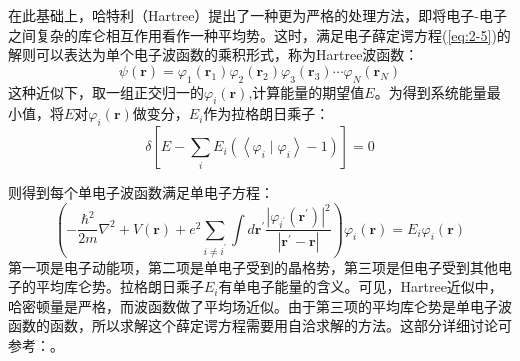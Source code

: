 在此基础上，哈特利（Hartree）提出了一种更为严格的处理方法\citep{hartree_1928}，即将电子-电子之间复杂的库仑相互作用看作一种平均势。这时，满足电子薛定谔方程(\ref{eq:2-5})的解则可以表达为单个电子波函数的乘积形式，称为Hartree波函数：
\begin{equation}
    \label{eq:2-6}
    \psi(\mathbf{r})=\varphi_{1}\left(\mathbf{r}_{1}\right) \varphi_{2}\left(\mathbf{r}_{2}\right) \varphi_{3}\left(\mathbf{r}_{3}\right) \cdots \varphi_{N}\left(\mathbf{r}_{N}\right)
\end{equation}
这种近似下，取一组正交归一的$\varphi_{i}(\mathbf{r})$,计算能量的期望值$E$。为得到系统能量最小值，将$E$对$\varphi_{i}(\mathbf{r})$做变分，$E_{i}$作为拉格朗日乘子：
\begin{equation}
    \label{eq:2-7}
    \delta\left[E-\sum_{i} E_{i}\left(\left\langle\varphi_{i} \mid \varphi_{i}\right\rangle-1\right)\right]=0
\end{equation}

则得到每个单电子波函数满足单电子方程：
\begin{equation}
    \label{eq:2-8}
    \left(-\frac{\hbar^{2}}{2 m} \nabla^{2}+V(\mathbf{r})+e^{2} \sum_{i \neq i^{\prime}} \int d \mathbf{r}^{\prime} \frac{\left|\varphi_{i^{\prime}}\left(\mathbf{r}^{\prime}\right)\right|^{2}}{\left|\mathbf{r}^{\prime}-\mathbf{r}\right|}\right) \varphi_{i}(\mathbf{r})=E_{i} \varphi_{i}(\mathbf{r})
\end{equation}
第一项是电子动能项，第二项是单电子受到的晶格势，第三项是但电子受到其他电子的平均库仑势。拉格朗日乘子$E_{i}$有单电子能量的含义。可见，Hartree近似中，哈密顿量是严格，而波函数做了平均场近似。由于第三项的平均库仑势是单电子波函数的函数，所以求解这个薛定谔方程需要用自洽求解的方法。这部分详细讨论可参考：\cite{solid}。

